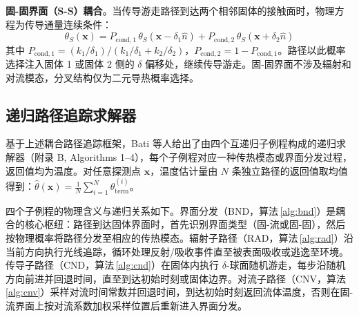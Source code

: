 \textbf{固-固界面（S-S）耦合}。当传导游走路径到达两个相邻固体的接触面时，物理方程为传导通量连续条件\cite{batiCouplingConductionConvection2023}：
\begin{equation}
  \theta_S(\mathbf{x}) = P_{\text{cond},1}\,\theta_S(\mathbf{x}-\delta_1\hat{n})
  + P_{\text{cond},2}\,\theta_S(\mathbf{x}+\delta_2\hat{n})
  \label{eq:ss_interface}
\end{equation}
其中 $P_{\text{cond},1} = (k_1/\delta_1)/(k_1/\delta_1 + k_2/\delta_2)$，$P_{\text{cond},2} = 1 - P_{\text{cond},1}$。路径以此概率选择注入固体 1 或固体 2 侧的 $\delta$ 偏移处，继续传导游走。固-固界面不涉及辐射和对流模态，分叉结构仅为二元导热概率选择。


\subsection{递归路径追踪求解器}

基于上述耦合路径追踪框架，Bati 等人\cite{batiCouplingConductionConvection2023}给出了由四个互递归子例程构成的递归求解器（附录 B, Algorithms 1--4），每个子例程对应一种传热模态或界面分发过程，返回值均为温度。对任意探测点 $\mathbf{x}$，温度估计量由 $N$ 条独立路径的返回值取均值得到：$\hat{\theta}(\mathbf{x}) = \frac{1}{N}\sum_{i=1}^{N}\theta_\text{term}^{(i)}$。

四个子例程的物理含义与递归关系如下。界面分发（BND，算法\,\ref{alg:bnd}）是耦合的核心枢纽：路径到达固体界面时，首先识别界面类型（固-流或固-固），然后按物理概率将路径分发至相应的传热模态。辐射子路径（RAD，算法\,\ref{alg:rad}）沿当前方向执行光线追踪，循环处理反射/吸收事件直至被表面吸收或逃逸至环境。传导子路径（CND，算法\,\ref{alg:cnd}）在固体内执行 $\delta$-球面随机游走，每步沿随机方向前进并回退时间，直至到达初始时刻或固体边界。对流子路径（CNV，算法\,\ref{alg:cnv}）采样对流时间常数并回退时间，到达初始时刻返回流体温度，否则在固-流界面上按对流系数加权采样位置后重新进入界面分发。

